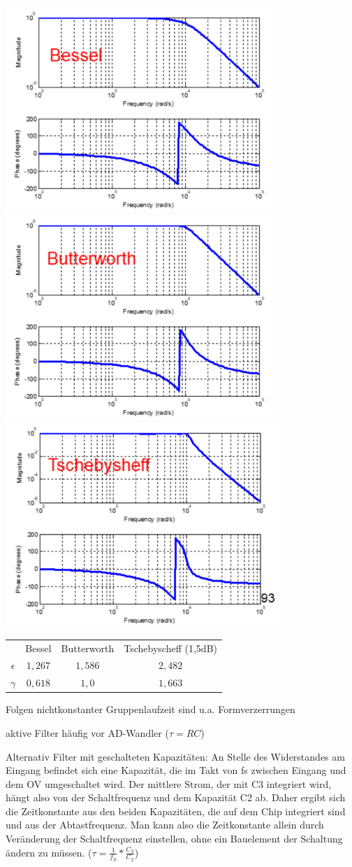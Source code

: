\documentclass[a4paper]{article}
\begin{document}
\begin{multicols}{3}
\begin{description*}
  \end{description*}
  \begin{center}
    \includegraphics[width=.3\linewidth]{Assets/Biosignalverarbeitung-aktive-filter-3.png}
    \includegraphics[width=.3\linewidth]{Assets/Biosignalverarbeitung-aktive-filter-4.png}
    \includegraphics[width=.3\linewidth]{Assets/Biosignalverarbeitung-aktive-filter2.png}
    \begin{tabular}{c|c|c|c}
                 & Bessel  & Butterworth & Tschebyscheff (1,5dB) \\
      $\epsilon$ & $1,267$ & $1,586$     & $2,482$               \\
      $\gamma$   & $0,618$ & $1,0$       & $1,663$
    \end{tabular}
  \end{center}
  \begin{itemize*}
    \item Folgen nichtkonstanter Gruppenlaufzeit sind u.a. Formverzerrungen
    \item aktive Filter häufig vor AD-Wandler ($\tau=RC$)
    \item Alternativ Filter mit geschalteten Kapazitäten: An Stelle des Widerstandes am Eingang befindet sich eine Kapazität, die im Takt von fs zwischen Eingang und dem OV umgeschaltet wird. Der mittlere Strom, der mit C3 integriert wird, hängt also von der Schaltfrequenz und dem Kapazität C2 ab. Daher ergibt sich die Zeitkonstante aus den beiden Kapazitäten, die auf dem Chip integriert sind und aus der Abtastfrequenz. Man kann also die Zeitkonstante allein durch Veränderung der Schaltfrequenz einstellen, ohne ein Bauelement der Schaltung ändern zu müssen. ($\tau=\frac{1}{f_S}*\frac{C_3}{C_2}$)

\end{itemize*}
\end{multicols}
\end{document}
